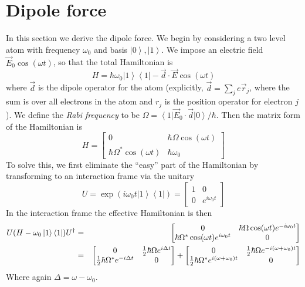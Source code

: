 \documentclass[aps,prb,floatfix,amsmath,amssymb,groupedaddress]{revtex4}
\begin{document}
\section{Dipole force}
In this section we derive the dipole force.  We begin by considering a two level atom with frequency $\omega_0$ and basis $\left|0\right>, \left|1\right>$.  We impose an electric field $\vec{E}_0\cos(\omega t)$, so that the total Hamiltonian is $$H = \hbar \omega_0 \left|1\right>\left<1\right| - \vec{d}\cdot\vec{E}\cos(\omega t)$$ where $\vec{d}$ is the dipole operator for the atom (explicitly, $\vec{d} = \sum_j e \vec{r}_j$, where the sum is over all electrons in the atom and $r_j$ is the position operator for electron $j$).  We define the \textit{Rabi frequency} to be $\Omega = \left<1\right| \vec{E}_0\cdot \vec{d} \left| 0\right>/\hbar$.  Then the matrix form of the Hamiltonian is $$H = 
\begin{bmatrix}
0 & \hbar\Omega \cos(\omega t) \\
\hbar \Omega^* \cos(\omega t) & \hbar \omega_0 
\end{bmatrix}
$$
To solve this, we first eliminate the ``easy'' part of the Hamiltonian by transforming to an interaction frame via the unitary $$U = \exp\left(i\omega_0 t \left|1\right>\left<1\right|\right) = 
\begin{bmatrix}
1 & 0 \\
0 & e^{i\omega_0 t}
\end{bmatrix}
$$ 
In the interaction frame the effective Hamiltonian is then 
\begin{eqnarray*} U(H-\omega_0 \left|1\right>\left<1\right|)U^\dagger & = & 
\begin{bmatrix}
0 & \hbar\Omega \cos(\omega t) e^{-i\omega_0 t} \\
\hbar \Omega^* \cos(\omega t) e^{i\omega_0 t} & 0
\end{bmatrix} \\
& = & 
\begin{bmatrix}
0 & {\frac{1}{2}} \hbar\Omega e^{i\Delta t} \\
{\frac{1}{2}}\hbar \Omega^* e^{-i\Delta t} & 0
\end{bmatrix}
+ 
\begin{bmatrix}
0 & {\frac{1}{2}} \hbar\Omega e^{-i(\omega + \omega_0) t} \\
{\frac{1}{2}} \hbar \Omega^* e^{i(\omega + \omega_0) t} & 0
\end{bmatrix} \\
\end{eqnarray*}
Where again $\Delta=\omega - \omega_0$.
\end{document}
